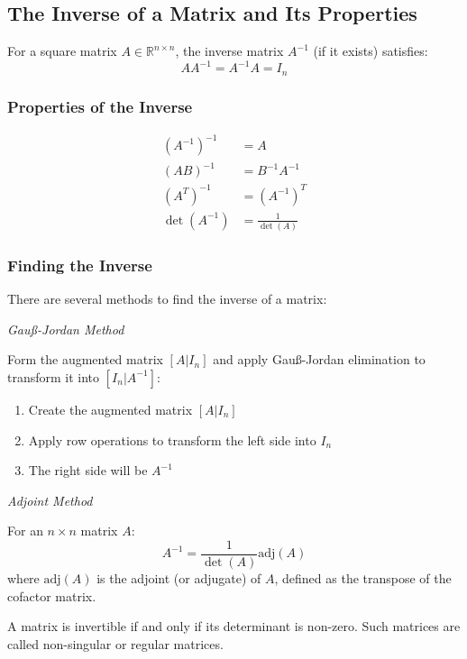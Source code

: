 \subsection{The Inverse of a Matrix and Its Properties}

For a square matrix \(A \in \mathbb{R}^{n \times n}\), the inverse matrix \(A^{-1}\) (if it exists) satisfies:
\begin{equation*}
A A^{-1} = A^{-1} A = I_n
\end{equation*}

\subsubsection{Properties of the Inverse}
\begin{align*}
(A^{-1})^{-1} &= A \\
(AB)^{-1} &= B^{-1}A^{-1} \\
(A^T)^{-1} &= (A^{-1})^T \\
\det(A^{-1}) &= \frac{1}{\det(A)}
\end{align*}

\subsubsection{Finding the Inverse}
There are several methods to find the inverse of a matrix:

\emph{Gauß-Jordan Method} 

Form the augmented matrix \([A|I_n]\) and apply Gauß-Jordan elimination to transform it into \([I_n|A^{-1}]\):
\begin{enumerate}
    \item Create the augmented matrix \([A|I_n]\)
    \item Apply row operations to transform the left side into \(I_n\)
    \item The right side will be \(A^{-1}\)
\end{enumerate}

\emph{Adjoint Method}

For an \(n \times n\) matrix \(A\):
\begin{equation*}
A^{-1} = \frac{1}{\det(A)} \text{adj}(A)
\end{equation*}
where \(\text{adj}(A)\) is the adjoint (or adjugate) of \(A\), defined as the transpose of the cofactor matrix.

A matrix is invertible if and only if its determinant is non-zero. Such matrices are called non-singular or regular matrices.

